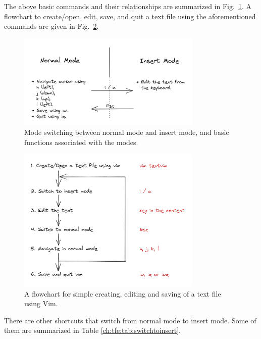 The above basic commands and their relationships are summarized in Fig.~\ref{ch:tfe:fig:vimbasicmodeswitching}. A flowchart to create/open, edit, save, and quit a text file using the aforementioned commands are given in Fig.~\ref{ch:tfe:fig:vimbasicoperationflowchart}.

\begin{figure}[!htb]
\centering
\includegraphics[width=250pt]{chapters/part-1/figures/vimbasicmodeswitching.png}
\caption{Mode switching between normal mode and insert mode, and basic functions associated with the modes.} \label{ch:tfe:fig:vimbasicmodeswitching}
\end{figure}

\begin{figure}[!htb]
\centering
\includegraphics[width=250pt]{chapters/part-1/figures/vimbasicoperationflowchart.png}
\caption{A flowchart for simple creating, editing and saving of a text file using Vim.} \label{ch:tfe:fig:vimbasicoperationflowchart}
\end{figure}

There are other shortcuts that switch from normal mode to insert mode. Some of them are summarized in Table \ref{ch:tfe:tab:switchtoinsert}.

